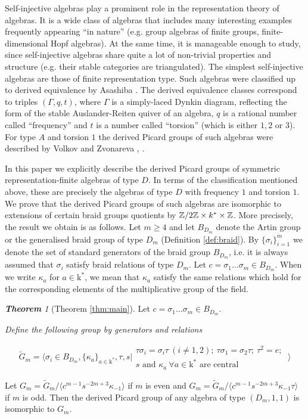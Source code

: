 \documentclass[12pt]{amsart}
\theoremstyle{plain}
\theoremstyle{remark}
\newtheorem*{theorem*}{{\bf Theorem}}
\theoremstyle{definition}
\def\kk{\mathrm{k}}
\begin{document}
Self-injective algebras play a prominent role in the representation theory of algebras. It is a wide class of algebras that includes many interesting examples frequently appearing ``in nature'' (e.g. group algebras of finite groups, finite-dimensional Hopf algebras). At the same time, it is manageable enough to study, since self-injective algebras share quite a lot of non-trivial properties and structure (e.g. their stable categories are triangulated). The simplest self-injective algebras are those of finite representation type. Such algebras were classified up to derived equivalence by Asashiba \cite{A}. The derived equivalence classes correspond to triples $(\Gamma, q, t)$, where $\Gamma$ is a simply-laced Dynkin diagram, reflecting the form of the stable Auslander-Reiten quiver of an algebra, $q$ is a rational number called ``frequency'' and $t$ is a number called ``torsion'' (which is either $1, 2$ or $3$). For type $A$ and torsion $1$ the derived Picard groups of such algebras were described by Volkov and Zvonareva \cite{VZ1}, \cite{Alexandra}. 

In this paper we explicitly describe the derived Picard groups of symmetric representation-finite algebras of type $D$. In terms of the classification mentioned above, these are precisely the algebras of type $D$ with frequency $1$ and torsion $1$. We prove that the derived Picard groups of such algebras are isomorphic to extensions of certain braid groups quotients by $ \mathbb Z/2\mathbb Z \times k^* \times \mathbb Z$. More precisely, the result we obtain is as follows. Let $m \geq 4$ and let $B_{D_m}$ denote the Artin group or the generalised braid group of type $D_m$ (Definition \ref{def:braid}). By $\{\sigma_i\}_{i=1}^m$ we denote the set of standard generators of the braid group $B_{D_m}$, i.e. it is always assumed that $\sigma_i$ satisfy braid relations of type $D_m$. Let $c =\sigma_1\dots\sigma_m \in B_{D_m}$. When we write $\kappa_a$ for $a \in \kk^*$, we mean that $\kappa_a$ satisfy the same relations which hold for the corresponding elements of the multiplicative group of the field. 

\newpage

\begin{theorem*}[Theorem \ref{thm:main}]  Let $c =\sigma_1\dots\sigma_m \in B_{D_m}$.
 {\it 
 Define the following group by generators and relations 

$$ \widetilde{G}_{m} = \bigg\langle \sigma_i \in B_{D_{m}},\{\kappa_a\}_{a \in \kk^*}, \tau, s \bigg| \begin{array}{c}
\tau \sigma_i = \sigma_i \tau \ (i\neq 1,2); \ \tau \sigma_1 = \sigma_2 \tau; \  \tau^2 = e; \  \\  s \text{ and }  \kappa_a \ \forall a \in \kk^* \text{ are central}
\end{array} \bigg\rangle $$

Let $G_m = \widetilde{G}_m/ \langle c^{m-1}s^{-2m+3} \kappa_{-1} \rangle$ if $m$ is even and $G_m = \widetilde{G}_m/ \langle c^{m-1}s^{-2m+3} \kappa_{-1}\tau \rangle$ if $m$ is odd. Then the derived Picard group of any algebra of type $(D_m,1,1)$ is isomorphic to $G_m$. }
\end{theorem*}
\end{document}
